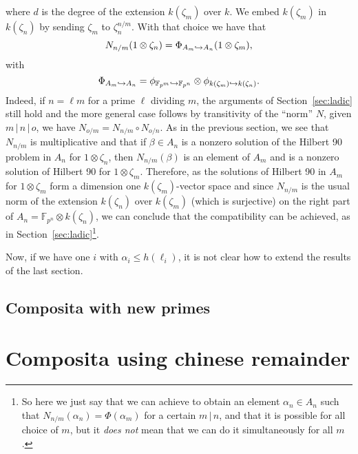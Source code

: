 \documentclass[a4paper,11pt]{article}
\begin{document}
where $d$ is the degree of the extension $k(\zeta_m)$ over $k$. We embed
$k(\zeta_m)$ in $k(\zeta_n)$ by sending $\zeta_m$ to $\zeta_n^{n/m}$. With that
choice we have that
\[
  N_{n/m}(1\otimes\zeta_n) = \Phi_{A_m\hookrightarrow A_n}(1\otimes\zeta_m),
\]
with 
\[
  \Phi_{A_m\hookrightarrow
  A_n}=\phi_{\mathbb{F}_{p^m}\hookrightarrow\mathbb{F}_{p^n}}\otimes\phi_{k(\zeta_m)\hookrightarrow
  k(\zeta_n)}.
\]
Indeed, if $n = \ell m$ for a prime $\ell$ dividing $m$, the arguments of
Section~\ref{sec:ladic} still hold and the more general case follows by
transitivity of the ``norm'' $N$, \ie given $m\,|\,n\,|\,o$, we have
$N_{o/m}=N_{n/m}\circ N_{o/n}$. As in the previous section, we see that
$N_{n/m}$ is multiplicative and that if $\beta\in A_n$ is a nonzero solution of
the Hilbert 90 problem in $A_n$ for $1\otimes\zeta_n$, then $N_{n/m}(\beta)$ is
an element of $A_m$ and is a nonzero solution of Hilbert 90 for
$1\otimes\zeta_m$. Therefore, as the solutions of Hilbert 90 in $A_m$ for
$1\otimes\zeta_m$ form a dimension one $k(\zeta_m)$-vector space and since
$N_{n/m}$ is the usual norm of the extension $k(\zeta_n)$ over $k(\zeta_m)$
(which is surjective) on the right part of $A_n=\mathbb{F}_{p^n}\otimes
k(\zeta_n)$, we can conclude that the compatibility can be achieved, as in
Section~\ref{sec:ladic}\footnote{So here we just say that we can achieve to
  obtain an element $\alpha_n\in A_n$ such that
  $N_{n/m}(\alpha_n)=\Phi(\alpha_m)$ for a certain $m\,|\,n$, and that it is
  possible for all choice of $m$, but it \emph{does not} mean that we can do it
simultaneously for all $m$.}.

Now, if we have one $i$ with $\alpha_i\leq h(\ell_i)$, it is not clear how to
extend the results of the last section.

\subsection{Composita with new primes}
\label{sec:comp-norm-w}


\section{Composita using chinese remainder}
\label{sec:comp-crt}
\end{document}
